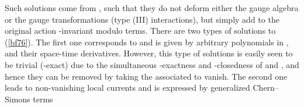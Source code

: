 \documentclass[a4paper,11pt]{article}
\begin{document}
Such solutions come from \coordHE{}, such
that they do not deform either the gauge algebra or the gauge
transformations (type (III) interactions), but simply add to the original
action \myHighlight{$\gamma $}\coordHE{}-invariant modulo \coordHE{} terms. There are two types of
solutions to (\ref{bf76}). The first one corresponds to \coordHE{} and is given by arbitrary polynomials in \coordHE{}, \coordHE{} and their space-time
derivatives. However, this type of solutions is easily seen to be trivial (\coordHE{}-exact) due to the simultaneous \myHighlight{$\delta $}\coordHE{}-exactness and \myHighlight{$\gamma $}\coordHE{}%
-closedness of \coordHE{} and \coordHE{}, and hence they can be removed by taking the associated \coordHE{} to vanish. The second one leads to
non-vanishing local currents \coordHE{} and is expressed by
generalized Chern--Simons terms
\end{document}
